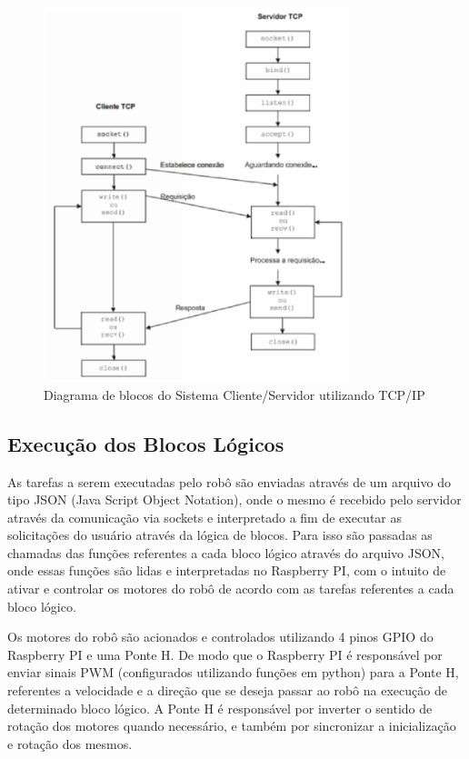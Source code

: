\begin{figure}[H]
    \centering
    \includegraphics[width=0.8\textwidth]{figuras/diagrama_socket.eps}
    \caption{Diagrama de blocos do Sistema Cliente/Servidor utilizando TCP/IP}
    \label{fig:catia01}
\end{figure}

\subsection{Execução dos Blocos Lógicos}

As tarefas a serem executadas pelo robô são enviadas através de um arquivo do tipo JSON (Java Script Object Notation), onde o mesmo é recebido pelo servidor através da comunicação via sockets e interpretado a fim de executar as solicitações do usuário através da lógica de blocos. Para isso são passadas as chamadas das funções referentes a cada bloco lógico através do arquivo JSON, onde essas funções são lidas e interpretadas no Raspberry PI, com o intuito de ativar e controlar os motores do robô de acordo com as tarefas referentes a cada bloco lógico.

Os motores do robô são acionados e controlados utilizando 4 pinos GPIO do Raspberry PI e uma Ponte H. De modo que o Raspberry PI é responsável por enviar sinais PWM (configurados utilizando funções em python) para a Ponte H, referentes a velocidade e a direção que se deseja passar ao robô na execução de determinado bloco lógico. A Ponte H é responsável por inverter o sentido de rotação dos motores quando necessário, e também por sincronizar a inicialização e rotação dos mesmos.

